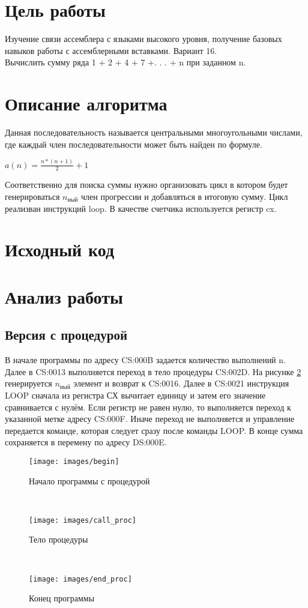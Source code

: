 \section{Цель работы}
Изучение связи ассемблера с языками высокого уровня, получение базовых навыков работы с ассемблерными вставками. Вариант 16.\\
Вычислить сумму ряда 1 + 2 + 4 + 7 +. . . + n при заданном n.
\newpage
\section{Описание алгоритма}
Данная последовательность называется центральными многоугольными числами, где каждый член последовательности может быть найден по формуле.\\	
\begin{center}
$a(n) =  \frac{n*(n+1)}{2} + 1$\\
\end{center} 
Соответственно для поиска суммы нужно организовать цикл в котором будет генерироваться $n_\text{ный}$ член прогрессии и добавляться в итоговую сумму.
Цикл реализван инструкций loop. В качестве счетчика используется регистр cx.
\newpage
\section{Исходный код}


\newpage
\section{Анализ работы}
\subsection{Версия с процедурой}
В начале программы по адресу CS:000B задается количество выполнений n. Далее в CS:0013 выполняется переход в тело процедуры CS:002D. На рисунке \ref{proc:2} генерируется $n_\text{ный}$ элемент и возврат к CS:0016. Далее в CS:0021 инструкция LOOP сначала из регистра СХ вычитает единицу и затем его значение сравнивается с нулём. Если регистр не равен нулю, то выполняется переход к указанной метке адресу CS:000F. Иначе переход не выполняется и управление передается команде, которая следует сразу после команды LOOP. В конце сумма сохраняется в перемену по адресу DS:000E.
\begin{figure}[ht!]
	\centering
	\texttt{[image: images/begin]}
	\caption{Начало программы с процедурой}
	\label{proc:1}
\end{figure}\\
\begin{figure}[ht!]
	\centering
	\texttt{[image: images/call\_proc]}
	\caption{Тело процедуры}
	\label{proc:2}
\end{figure}\\
\begin{figure}[ht!]
	\centering
	\texttt{[image: images/end\_proc]}
	\caption{Конец программы}
	\label{proc:3}
\end{figure}\\

